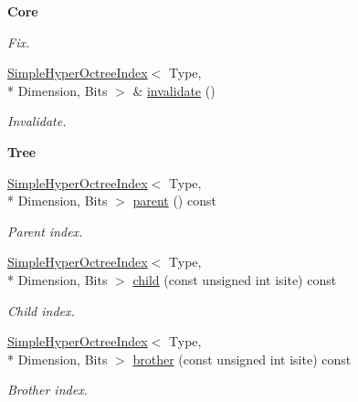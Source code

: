 \begin{Indent}{\bf Core}
\begin{DoxyCompactItemize}
\begin{DoxyCompactList}\small\item\em Fix. \end{DoxyCompactList}\item 
\hyperlink{exceptionmagrathea_1_1SimpleHyperOctreeIndex}{Simple\-Hyper\-Octree\-Index}$<$ Type, \\*
Dimension, Bits $>$ \& \hyperlink{exceptionmagrathea_1_1SimpleHyperOctreeIndex_acde2e7cebd79ea55e7d81c8118751a02}{invalidate} ()
\begin{DoxyCompactList}\small\item\em Invalidate. \end{DoxyCompactList}\end{DoxyCompactItemize}
\end{Indent}
\begin{Indent}{\bf Tree}\par
\begin{DoxyCompactItemize}
\item 
\hyperlink{exceptionmagrathea_1_1SimpleHyperOctreeIndex}{Simple\-Hyper\-Octree\-Index}$<$ Type, \\*
Dimension, Bits $>$ \hyperlink{exceptionmagrathea_1_1SimpleHyperOctreeIndex_a338afba057f94093512b83f70339b1d6}{parent} () const 
\begin{DoxyCompactList}\small\item\em Parent index. \end{DoxyCompactList}\item 
\hyperlink{exceptionmagrathea_1_1SimpleHyperOctreeIndex}{Simple\-Hyper\-Octree\-Index}$<$ Type, \\*
Dimension, Bits $>$ \hyperlink{exceptionmagrathea_1_1SimpleHyperOctreeIndex_a728ba111e2c38181d8a00376498c3f2e}{child} (const unsigned int isite) const 
\begin{DoxyCompactList}\small\item\em Child index. \end{DoxyCompactList}\item 
\hyperlink{exceptionmagrathea_1_1SimpleHyperOctreeIndex}{Simple\-Hyper\-Octree\-Index}$<$ Type, \\*
Dimension, Bits $>$ \hyperlink{exceptionmagrathea_1_1SimpleHyperOctreeIndex_aa7294c3f55961074982c717a8452c6d0}{brother} (const unsigned int isite) const 
\begin{DoxyCompactList}\small\item\em Brother index. \end{DoxyCompactList}\item 

\end{DoxyCompactItemize}
\end{Indent}
